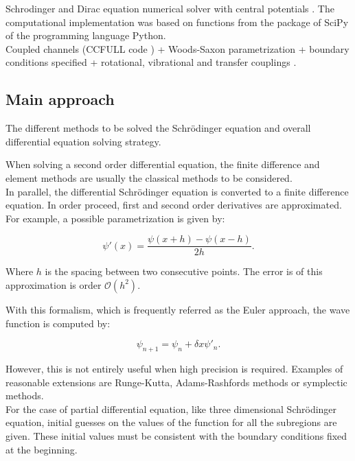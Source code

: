 \documentclass[openany]{book}
\begin{document}
Schrodinger and Dirac equation numerical solver with central potentials \cite{salvat_fernandez-varea_2019}. The computational implementation was based on functions from the package of SciPy of the programming language Python. \\

Coupled channels (CCFULL code ) + Woods-Saxon parametrization + boundary conditions specified + rotational, vibrational and transfer couplings \cite{hagino_rowley_kruppa_1999}.

\subsection{Main approach} \label{sub:diffSolvingMainApproach}

The different methods to be solved the Schrödinger equation and overall differential equation solving strategy. 

When solving a second order differential equation, the finite difference and element methods are usually the classical methods to be considered.  \\

In parallel, the differential Schrödinger equation is converted to a finite difference equation. In order proceed, first and second order derivatives are approximated. For example, a possible parametrization is given by:

\begin{equation}\label{eq:numericalIntegration_central_derivative}
	\psi'(x) = \frac{\psi(x + h) - \psi(x - h)}{2h}. 
\end{equation}

Where $h$ is the spacing between two consecutive points. The error is of this approximation is order $\mathcal{O}(h^2)$. 

With this formalism, which is frequently referred as the Euler approach, the wave function is computed by: 

\begin{equation}\label{eq:numericalIntegration_Euler_approximation}
	\psi_{n+1} = \psi_{n} + \delta x \psi'_{n}.
\end{equation}

However, this is not entirely useful when high precision is required. Examples of reasonable extensions are Runge-Kutta, Adams-Rashfords methods or symplectic methods. \\


For the case of partial differential equation, like three dimensional Schrödinger equation,  initial guesses on the values of the function for all the  subregions are given. These initial values must be consistent with the boundary conditions fixed at the beginning. \\
\end{document}

